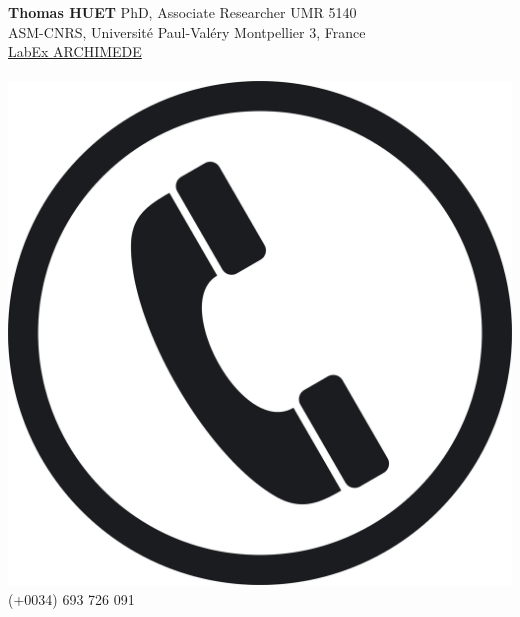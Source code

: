 \documentclass{article}
\begin{document}
\large{\textbf{Thomas HUET}} PhD, Associate Researcher UMR 5140\\
ASM-CNRS, Universit\'{e} Paul-Val\'{e}ry Montpellier 3, France \\
\href{https://archimede.cnrs.fr/index.php/annuaire/123-annuaire/e-h/456-thomas-huet}{LabEx ARCHIMEDE}\\
\\
\includegraphics[scale=0.005]{phone} \quad (+0034) 693 726 091 \\
\end{document}
